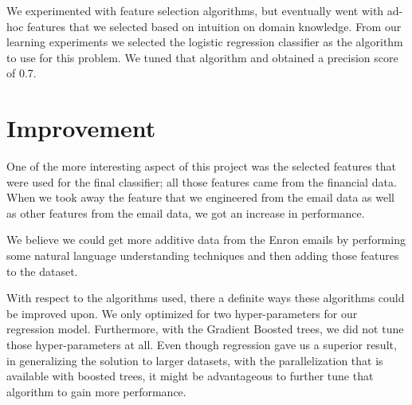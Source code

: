 \documentclass[twoside,openright,titlepage,numbers=noenddot,headinclude,%
               footinclude=true,cleardoublepage=empty,abstractoff,BCOR=5mm,%
               paper=a4,fontsize=11pt,ngerman,american]{scrreprt}
\numberwithin{theorem}{chapter}
\numberwithin{definition}{chapter}
\numberwithin{algorithm}{chapter}
\numberwithin{figure}{chapter}
\numberwithin{table}{chapter}
\numberwithin{equation}{chapter}
\begin{document}
We experimented with feature selection algorithms, but eventually went with ad-hoc features that we selected based on intuition on domain knowledge. From our learning experiments we selected the logistic regression classifier as the algorithm to use for this problem. We tuned that algorithm and obtained a precision score of 0.7.

\section*{Improvement}
One of the more interesting aspect of this project was the selected features that were used for the final classifier; all those features came from the financial data. When we took away the feature that we engineered from the email data as well as other features from the email data, we got an increase in performance. 

We believe we could get more additive data from the Enron emails by performing some natural language understanding techniques and then adding those features to the dataset.

With respect to the algorithms used, there a definite ways these algorithms could be improved upon. We only optimized for two hyper-parameters for our regression model. Furthermore, with the Gradient Boosted trees, we did not tune those hyper-parameters at all. Even though regression gave us a superior result, in generalizing the solution to larger datasets, with the parallelization that is available with boosted trees, it might be advantageous to further tune that algorithm to gain more performance.
\end{document}
